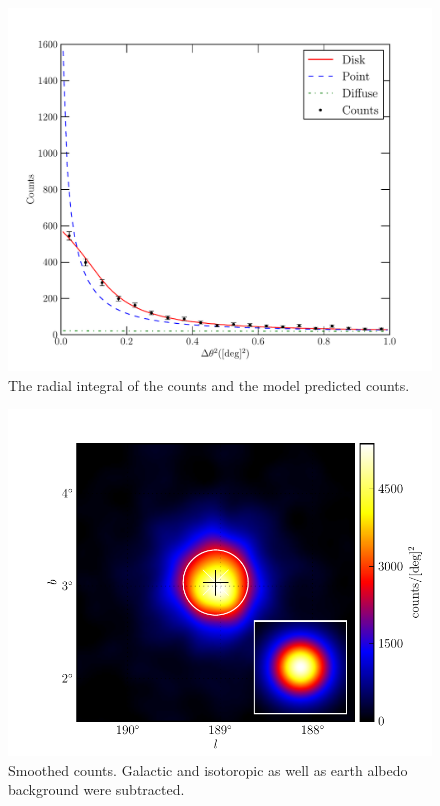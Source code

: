 \documentclass[preprint]{aastex}
\begin{document}
\clearpage
\begin{figure}
  \begin{center}
    \includegraphics{ic443_plots/ic443_radial_integral.pdf}
    \caption{The radial integral of the counts and the model predicted counts.}
    \label{radial_profile}
  \end{center}
\end{figure}

\clearpage
\begin{figure}
  \begin{center}
    \includegraphics{ic443_plots/ic443_smoothed_counts.pdf}
    \caption{Smoothed counts. Galactic and isotoropic as well as earth albedo background were subtracted.
    }
    \label{smoothed_counts}
  \end{center}
\end{figure}
\end{document}

